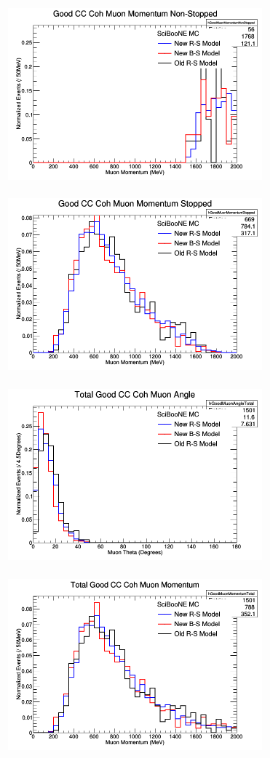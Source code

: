 \documentclass[11pt]{article}
\begin{document}
\begin{figure}[H]
\centering
\includegraphics[width=0.6\textwidth]{NMCombinedPlotsImages/12-NMCombinedPlots.png}
\caption{}
\end{figure}

\begin{figure}[H]
\centering
\includegraphics[width=0.6\textwidth]{NMCombinedPlotsImages/13-NMCombinedPlots.png}
\caption{}
\end{figure}

\begin{figure}[H]
\centering
\includegraphics[width=0.6\textwidth]{NMCombinedPlotsImages/14-NMCombinedPlots.png}
\caption{}
\end{figure}

\begin{figure}[H]
\centering
\includegraphics[width=0.6\textwidth]{NMCombinedPlotsImages/15-NMCombinedPlots.png}
\caption{}
\end{figure}
\end{document}
